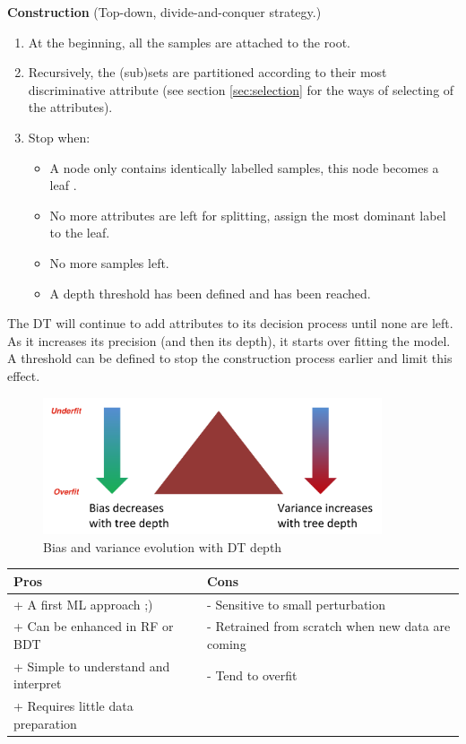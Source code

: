 \textbf{Construction} (Top-down, divide-and-conquer strategy.)
\begin{enumerate}
  \item At the beginning, all the samples are attached to the root.
  \item Recursively, the (sub)sets are partitioned according to their most discriminative attribute (see section \ref{sec:selection} for the ways of selecting of the attributes).
  \item Stop when:
  \begin{itemize}
  	\item A node only contains identically labelled samples, this node becomes a leaf .
  	\item No more attributes are left for splitting, assign the most dominant label to the leaf.
  	\item No more samples left.
  	\item A depth threshold has been defined and has been reached.
  \end{itemize}
\end{enumerate}

The DT will continue to add attributes to its decision process until none are left. As it increases its precision (and then its depth), it starts over fitting the model. A threshold can be defined to stop the construction process earlier and limit this effect. 

\begin{figure}[H]%
 \centering
 \includegraphics[width=10cm]{./img/07/bias_variance_DT.png}
 \caption{\label{pic:bias_variance_DT.} Bias and variance evolution with DT depth}
\end{figure}

\begin{center} %
\begin{tabular} {| l | l |}
\hline
\bf Pros & \bf Cons \\ \hline
+ A first ML approach ;) & - Sensitive to small perturbation  \\
+ Can be enhanced in RF or BDT  & - Retrained from scratch when new data are coming \\
+ Simple to understand and interpret & - Tend to overfit \\
+ Requires little data preparation \\ 
\hline
\end{tabular}
\end{center}



